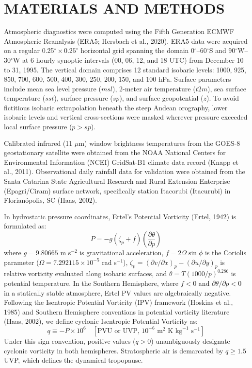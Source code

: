 \documentclass[twocolumn,a4paper,10pt]{article}
\begin{document}
\section{MATERIALS AND METHODS}
Atmospheric diagnostics were computed using the Fifth Generation ECMWF Atmospheric Reanalysis (ERA5; Hersbach et al., 2020). ERA5 data were acquired on a regular 0.25$^\circ \times 0.25^\circ$ horizontal grid spanning the domain 0$^\circ$--60$^\circ$S and 90$^\circ$W--30$^\circ$W at 6-hourly synoptic intervals (00, 06, 12, and 18 UTC) from December 10 to 31, 1995. The vertical domain comprises 12 standard isobaric levels: 1000, 925, 850, 700, 600, 500, 400, 300, 250, 200, 150, and 100 hPa. Surface parameters include mean sea level pressure ($msl$), 2-meter air temperature ($t2m$), sea surface temperature ($sst$), surface pressure ($sp$), and surface geopotential ($z$). To avoid fictitious isobaric extrapolation beneath the steep Andean orography, lower isobaric levels and vertical cross-sections were masked wherever pressure exceeded local surface pressure ($p > sp$).

Calibrated infrared (11 $\mu$m) window brightness temperatures from the GOES-8 geostationary satellite were obtained from the NOAA National Centers for Environmental Information (NCEI) GridSat-B1 climate data record (Knapp et al., 2011). Observational daily rainfall data for validation were obtained from the Santa Catarina State Agricultural Research and Rural Extension Enterprise (Epagri/Ciram) surface network, specifically station Itacorubi (Itacurubi) in Florianópolis, SC (Haas, 2002).

In hydrostatic pressure coordinates, Ertel's Potential Vorticity (Ertel, 1942) is formulated as:
\begin{equation}
P = -g (\zeta_p + f) \left( \frac{\partial \theta}{\partial p} \right)
\end{equation}
where $g = 9.80665$ m s$^{-2}$ is gravitational acceleration, $f = 2\Omega \sin\phi$ is the Coriolis parameter ($\Omega = 7.292115 \times 10^{-5}$ rad s$^{-1}$), $\zeta_p = (\partial v/\partial x)_p - (\partial u/\partial y)_p$ is relative vorticity evaluated along isobaric surfaces, and $\theta = T (1000/p)^{0.286}$ is potential temperature. In the Southern Hemisphere, where $f < 0$ and $\partial\theta/\partial p < 0$ in a statically stable atmosphere, Ertel PV values are algebraically negative. Following the Isentropic Potential Vorticity (IPV) framework (Hoskins et al., 1985) and Southern Hemisphere conventions in potential vorticity literature (Haas, 2002), we define cyclonic Isentropic Potential Vorticity as:
\begin{equation}
q \equiv -P \times 10^6 \quad [\text{PVU or UVP, } 10^{-6}\text{ m}^2\text{ K kg}^{-1}\text{ s}^{-1}]
\end{equation}
Under this sign convention, positive values ($q > 0$) unambiguously designate cyclonic vorticity in both hemispheres. Stratospheric air is demarcated by $q \ge 1.5$ UVP, which defines the dynamical tropopause.
\end{document}
